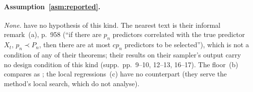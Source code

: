 \paragraph{Assumption~\ref{asm:reported}.} \emph{None.} \SL{} have no hypothesis of this kind. The nearest text is their informal remark~(a), p.~958 (``if there
are $p_n$ predictors correlated with the true predictor $X_t$, $p_n\prec P_n$, then there are at most $cp_n$ predictors to
be selected''), which is not a condition of any of their theorems; their results on their sampler's output carry no design
condition of this kind (supp.\ pp.~9--10, 12--13, 16--17). The floor~(b) compares as ; the local regressions~(c)
have no counterpart (they serve the method's local search, which \SL{} do not analyse).
